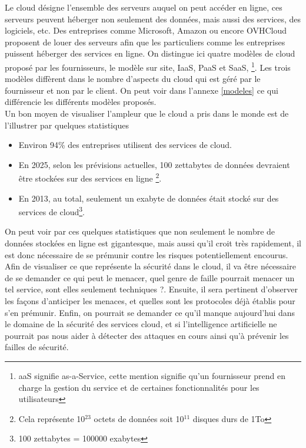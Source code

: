 \documentclass[a4paper, 12pt]{article}
\begin{document}
\begin{spacing}{1.1}
    Le cloud désigne l'ensemble des serveurs auquel on peut accéder en ligne,
    ces serveurs peuvent héberger non seulement des données, mais aussi des
    services, des logiciels, etc. Des entreprises comme Microsoft, Amazon ou
    encore OVHCloud proposent de louer des serveurs afin que les particuliers
    comme les entreprises puissent héberger des services en ligne. On distingue
    ici quatre modèles de cloud proposé par les fournisseurs, le modèle sur
    site, IaaS, PaaS et SaaS, \footnote{aaS signifie as-a-Service, cette mention
    signifie qu'un fournisseur prend en charge la gestion du service et de
    certaines fonctionnalités pour les utilisateurs}. Les trois modèles
    diffèrent dans le nombre d'aspects du cloud qui est géré par le fournisseur
    et non par le client. On peut voir dans l'annexe \ref{modeles} ce qui
    différencie les différents modèles proposés. \\

    Un bon moyen de visualiser l'ampleur que le cloud a pris dans le monde est
    de l'illustrer par quelques statistiques

    \begin{itemize}
      \item Environ 94\% des entreprises utilisent des services de cloud.
      \item En 2025, selon les prévisions actuelles, 100 zettabytes de données
            devraient être stockées sur des services en ligne
            \footnote{Cela représente 10$^{23}$ octets de données soit
            10$^{11}$ disques durs de 1To}.
      \item En 2013, au total, seulement un exabyte de données était stocké
            sur des services de cloud\footnote{100 zettabytes = 100000
            exabytes}.
    \end{itemize}

    On peut voir par ces quelques statistiques que non seulement le nombre de
    données stockées en ligne est gigantesque, mais aussi qu'il croit très
    rapidement, il est donc nécessaire de se prémunir contre les risques
    potentiellement encourus. \\

    Afin de visualiser ce que représente la sécurité dans le cloud, il va être
    nécessaire de se demander ce qui peut le menacer, quel genre de faille
    pourrait menacer un tel service, sont elles seulement techniques ?. Ensuite,
    il sera pertinent d'observer les façons d'anticiper les menaces, et quelles
    sont les protocoles déjà établis pour s'en prémunir. Enfin, on pourrait se
    demander ce qu'il manque aujourd'hui dans le domaine de la sécurité des
    services cloud, et si l'intelligence artificielle ne pourrait pas nous aider
    à détecter des attaques en cours ainsi qu'à prévenir les failles de
    sécurité.


\end{spacing}
\end{document}
